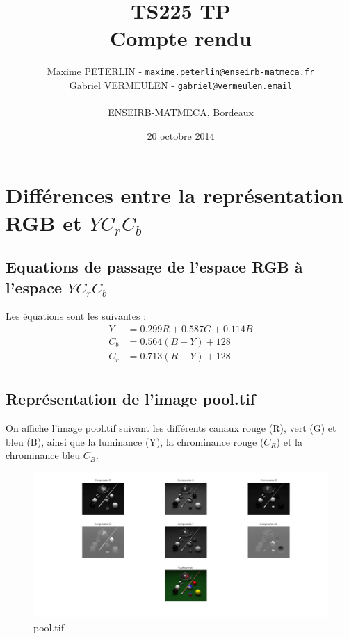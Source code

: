 \documentclass[11pt]{article}
\title{\textbf{TS225 TP}\\Compte rendu}
\author{Maxime PETERLIN - \texttt{maxime.peterlin@enseirb-matmeca.fr}\\
Gabriel VERMEULEN - \texttt{gabriel@vermeulen.email} \\\\{ENSEIRB-MATMECA, Bordeaux}}
\date{20 octobre 2014}
\begin{document}
\maketitle
\tableofcontents

\newpage

\section{Différences entre la représentation RGB et $YC_{r}C_{b}$}
	
	\subsection{Equations de passage de l'espace RGB à l'espace $YC_{r}C_{b}$}

		Les équations sont les suivantes :
		\begin{align*}
			Y &= 0.299 R + 0.587 G + 0.114 B\\
			C_{b} &= 0.564(B-Y) + 128\\
			C_{r} &= 0.713(R-Y) + 128\\
		\end{align*}

	\subsection{Représentation de l'image pool.tif}

		On affiche l'image pool.tif suivant les différents canaux rouge (R), vert (G) et bleu (B), ainsi que la luminance (Y), la chrominance rouge ($C_{R}$) et la chrominance bleu $C_{B}$.\\

		\begin{figure}[h]
			\centering
			\includegraphics[scale=0.25]{img/rapport_img1-1.jpg}
			\caption{pool.tif}
			\label{Q412}
		\end{figure}
\end{document}
